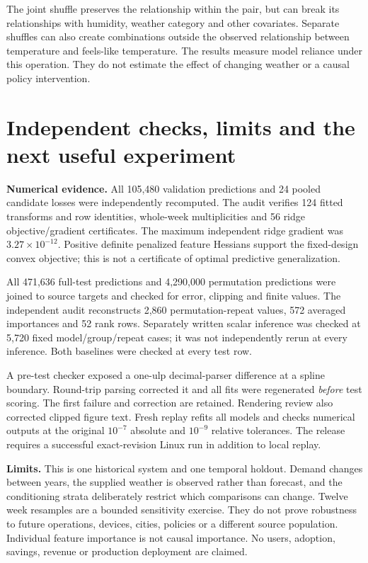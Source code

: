 \documentclass[11pt,letterpaper]{article}
\begin{document}
The joint shuffle preserves the relationship within the pair, but can break its relationships with humidity, weather category and other covariates. Separate shuffles can also create combinations outside the observed relationship between temperature and feels-like temperature. The results measure model reliance under this operation. They do not estimate the effect of changing weather or a causal policy intervention.

\clearpage
\section*{Independent checks, limits and the next useful experiment}
\textbf{Numerical evidence.} All 105,480 validation predictions and 24 pooled candidate losses were independently recomputed. The audit verifies 124 fitted transforms and row identities, whole-week multiplicities and 56 ridge objective/gradient certificates. The maximum independent ridge gradient was \(3.27\times10^{-12}\). Positive definite penalized feature Hessians support the fixed-design convex objective; this is not a certificate of optimal predictive generalization.

All 471,636 full-test predictions and 4,290,000 permutation predictions were joined to source targets and checked for error, clipping and finite values. The independent audit reconstructs 2,860 permutation-repeat values, 572 averaged importances and 52 rank rows. Separately written scalar inference was checked at 5,720 fixed model/group/repeat cases; it was not independently rerun at every inference. Both baselines were checked at every test row.

A pre-test checker exposed a one-ulp decimal-parser difference at a spline boundary. Round-trip parsing corrected it and all fits were regenerated \emph{before} test scoring. The first failure and correction are retained. Rendering review also corrected clipped figure text. Fresh replay refits all models and checks numerical outputs at the original \(10^{-7}\) absolute and \(10^{-9}\) relative tolerances. The release requires a successful exact-revision Linux run in addition to local replay.

\textbf{Limits.} This is one historical system and one temporal holdout. Demand changes between years, the supplied weather is observed rather than forecast, and the conditioning strata deliberately restrict which comparisons can change. Twelve week resamples are a bounded sensitivity exercise. They do not prove robustness to future operations, devices, cities, policies or a different source population. Individual feature importance is not causal importance. No users, adoption, savings, revenue or production deployment are claimed.
\end{document}
